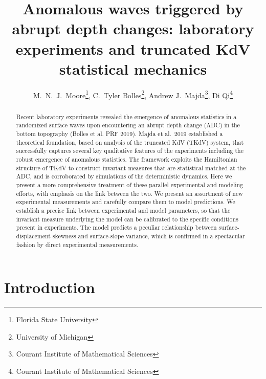 \documentclass[11pt]{article}
\begin{document}
\title{Anomalous waves triggered by abrupt depth changes: laboratory experiments and truncated KdV statistical mechanics}


\author{
M.~N.~J.~Moore\thanks{Florida State University}, 
C.~Tyler Bolles\thanks{University of Michigan},
Andrew J.~Majda\thanks{Courant Institute of Mathematical Sciences}, 
Di Qi\thanks{Courant Institute of Mathematical Sciences} }
\maketitle

\begin{abstract} 
Recent laboratory experiments revealed the emergence of anomalous statistics in a randomized surface waves upon encountering an abrupt depth change (ADC) in the bottom topography (Bolles et al. PRF 2019). Majda et al.~2019 established a theoretical foundation, based on analysis of the truncated KdV (TKdV) system, that successfully captures several key qualitative features of the experiments including the robust emergence of anomalous statistics. The framework exploits the Hamiltonian structure of TKdV to construct invariant measures that are statistical matched at the ADC, and is corroborated by simulations of the deterministic dynamics. 
%
Here we present a more comprehensive treatment of these parallel experimental and modeling efforts, with emphasis on the link between the two. We present an assortment of new experimental measurements and carefully compare them to model predictions. We establish a precise link between experimental and model parameters, so that the invariant measure underlying the model can be calibrated to the specific conditions present in experiments. The model predicts a peculiar relationship between surface-displacement skewness and surface-slope variance, which is confirmed in a spectacular fashion by direct experimental measurements.
\end{abstract}


\section{Introduction}
\end{document}
